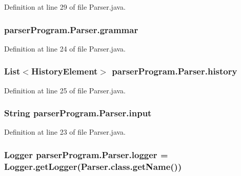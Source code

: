 Definition at line 29 of file Parser.\-java.

\hypertarget{classparser_program_1_1_parser_a4a70fbf9ba96a8d228f6e569641755ae}{
\subsubsection[{grammar}]{ {\bf parser\-Program.\-Parser.\-grammar}}}\label{classparser_program_1_1_parser_a4a70fbf9ba96a8d228f6e569641755ae}


Definition at line 24 of file Parser.\-java.

\hypertarget{classparser_program_1_1_parser_ac2de45e9afed9d3991a11485f62f468b}{
\subsubsection[{history}]{\setlength{\rightskip}{0pt plus 5cm}List$<${\bf History\-Element}$>$ {\bf parser\-Program.\-Parser.\-history}}}\label{classparser_program_1_1_parser_ac2de45e9afed9d3991a11485f62f468b}


Definition at line 25 of file Parser.\-java.

\hypertarget{classparser_program_1_1_parser_ac728347af517d44c609290f2b56cda49}{
\subsubsection[{input}]{\setlength{\rightskip}{0pt plus 5cm}String {\bf parser\-Program.\-Parser.\-input}}}\label{classparser_program_1_1_parser_ac728347af517d44c609290f2b56cda49}


Definition at line 23 of file Parser.\-java.

\hypertarget{classparser_program_1_1_parser_ac181ea955dedf17144ec49b6c57a9d55}{
\subsubsection[{logger}]{\setlength{\rightskip}{0pt plus 5cm}Logger {\bf parser\-Program.\-Parser.\-logger} = Logger.\-get\-Logger(Parser.\-class.\-get\-Name())}}\label{classparser_program_1_1_parser_ac181ea955dedf17144ec49b6c57a9d55}


